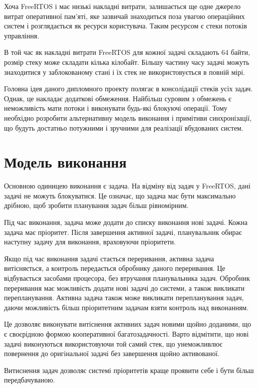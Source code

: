 \documentclass[oneside,14pt,a4paper,final]{myextreport}
\begin{document}
Хоча FreeRTOS і має низькі накладні витрати, залишається ще одне джерело витрат оперативної пам'яті, яке зазвичай знаходиться поза увагою операційних систем і розглядається як ресурси користувача. Таким ресурсом є стеки потоків управління.

В той час як накладні витрати FreeRTOS для кожної задачі складають 64 байти, розмір стеку може складати кілька кілобайт. Більшу частину часу задачі можуть знаходитися у заблокованому стані і їх стек не використовується в повній мірі.

Головна ідея даного дипломного проекту полягає в консолідації стеків усіх задач. Однак, це накладає додаткові обмеження. Найбільш суровим з обмежень є неможливість мати потоки і виконувати будь-які блокуючі операції. Тому необхідно розробити альтернативну модель виконання і примітиви синхронізації, що будуть достатньо потужними і зручними для реалізації вбудованих систем.

\section{Модель виконання}

Основною одиницею виконання є задача. На відміну від задач у FreeRTOS, дані задачі не можуть блокуватися. Це означає, що задача має бути максимально дрібною, щоб зробити планування задач більш рівномірним.

Під час виконання, задача може додати до списку виконання нові задачі. Кожна задача має пріоритет. Після завершення активної задачі, планувальник обирає наступну задачу для виконання, враховуючи пріоритети.

Якщо під час виконання задачі стається переривання, активна задача витісняється, а контроль передається обробнику даного переривання. Це відбувається засобами процесора, без втручання планувальника задач. Обробник переривання має можливість додати нові задачі до системи, а також викликати перепланування. Активна задача також може викликати перепланування задач, даючи можливість більш пріоритетним задачам взяти контроль над виконанням.

Це дозволяє виконувати витіснення активних задач новими щойно доданими, що є своєрідною формою кооперативної багатозадачності. Варто відмітити, що нові задачі виконуються використовуючи той самий стек, що унеможливлює повернення до оригінальної задачі без завершення щойно активованої.

Витиснення задач дозволяє системі пріоритетів краще проявити себе і бути більш передбачуваною.
\end{document}
